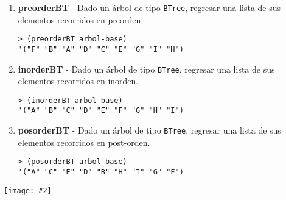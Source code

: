 \documentclass{article}
\newcommand{\jimage}[2]{\texttt{[image: \#2]}\vskip10pt}
\begin{document}
\begin{enumerate}
\item  \textbf{preorderBT} - Dado un árbol de tipo \verb;BTree;, regresar una lista de sus elementos recorridos en preorden.
\begin{verbatim}
> (preorderBT arbol-base)
'("F" "B" "A" "D" "C" "E" "G" "I" "H")
\end{verbatim}

\item  \textbf{inorderBT}  - Dado un árbol de tipo \verb;BTree;, regresar una lista de sus elementos recorridos en inorden.
\begin{verbatim}
> (inorderBT arbol-base)
'("A" "B" "C" "D" "E" "F" "G" "H" "I")
\end{verbatim}

\item \textbf{posorderBT} - Dado un árbol de tipo \verb;BTree;, regresar una lista de sus elementos recorridos en post-orden.
\begin{verbatim}
> (posorderBT arbol-base)
'("A" "C" "E" "D" "B" "H" "I" "G" "F")
\end{verbatim}
   
\end{enumerate}

\jimage{0.8}{imgs/orders.png}
\end{document}
